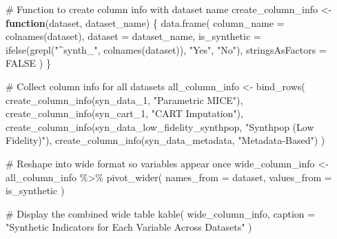 \documentclass[
  letterpaper,
  DIV=11,
  numbers=noendperiod]{scrartcl}
\newenvironment{Shaded}{\begin{snugshade}}{\end{snugshade}}
\newcommand{\AttributeTok}[1]{\textcolor[rgb]{0.40,0.45,0.13}{#1}}
\newcommand{\CommentTok}[1]{\textcolor[rgb]{0.37,0.37,0.37}{#1}}
\newcommand{\ConstantTok}[1]{\textcolor[rgb]{0.56,0.35,0.01}{#1}}
\newcommand{\ControlFlowTok}[1]{\textcolor[rgb]{0.00,0.23,0.31}{\textbf{#1}}}
\newcommand{\FunctionTok}[1]{\textcolor[rgb]{0.28,0.35,0.67}{#1}}
\newcommand{\NormalTok}[1]{\textcolor[rgb]{0.00,0.23,0.31}{#1}}
\newcommand{\OtherTok}[1]{\textcolor[rgb]{0.00,0.23,0.31}{#1}}
\newcommand{\SpecialCharTok}[1]{\textcolor[rgb]{0.37,0.37,0.37}{#1}}
\newcommand{\StringTok}[1]{\textcolor[rgb]{0.13,0.47,0.30}{#1}}
\begin{document}
\begin{Shaded}
\begin{Highlighting}[]
\CommentTok{\# Function to create column info with dataset name}
\NormalTok{create\_column\_info }\OtherTok{\textless{}{-}} \ControlFlowTok{function}\NormalTok{(dataset, dataset\_name) \{}
  \FunctionTok{data.frame}\NormalTok{(}
    \AttributeTok{column\_name =} \FunctionTok{colnames}\NormalTok{(dataset),}
    \AttributeTok{dataset =}\NormalTok{ dataset\_name,}
    \AttributeTok{is\_synthetic =} \FunctionTok{ifelse}\NormalTok{(}\FunctionTok{grepl}\NormalTok{(}\StringTok{"\^{}synth\_"}\NormalTok{, }\FunctionTok{colnames}\NormalTok{(dataset)), }\StringTok{"Yes"}\NormalTok{, }\StringTok{"No"}\NormalTok{),}
    \AttributeTok{stringsAsFactors =} \ConstantTok{FALSE}
\NormalTok{  )}
\NormalTok{\}}

\CommentTok{\# Collect column info for all datasets}
\NormalTok{all\_column\_info }\OtherTok{\textless{}{-}} \FunctionTok{bind\_rows}\NormalTok{(}
  \FunctionTok{create\_column\_info}\NormalTok{(syn\_data\_1, }\StringTok{"Parametric MICE"}\NormalTok{),}
  \FunctionTok{create\_column\_info}\NormalTok{(syn\_cart\_1, }\StringTok{"CART Imputation"}\NormalTok{),}
  \FunctionTok{create\_column\_info}\NormalTok{(syn\_data\_low\_fidelity\_synthpop, }\StringTok{"Synthpop (Low Fidelity)"}\NormalTok{),}
  \FunctionTok{create\_column\_info}\NormalTok{(syn\_data\_metadata, }\StringTok{"Metadata{-}Based"}\NormalTok{)}
\NormalTok{)}

\CommentTok{\# Reshape into wide format so variables appear once}
\NormalTok{wide\_column\_info }\OtherTok{\textless{}{-}}\NormalTok{ all\_column\_info }\SpecialCharTok{\%\textgreater{}\%}
  \FunctionTok{pivot\_wider}\NormalTok{(}
    \AttributeTok{names\_from =}\NormalTok{ dataset,}
    \AttributeTok{values\_from =}\NormalTok{ is\_synthetic}
\NormalTok{  )}

\CommentTok{\# Display the combined wide table}
\FunctionTok{kable}\NormalTok{(}
\NormalTok{  wide\_column\_info,}
  \AttributeTok{caption =} \StringTok{"Synthetic Indicators for Each Variable Across Datasets"}
\NormalTok{)}
\end{Highlighting}
\end{Shaded}
\end{document}
